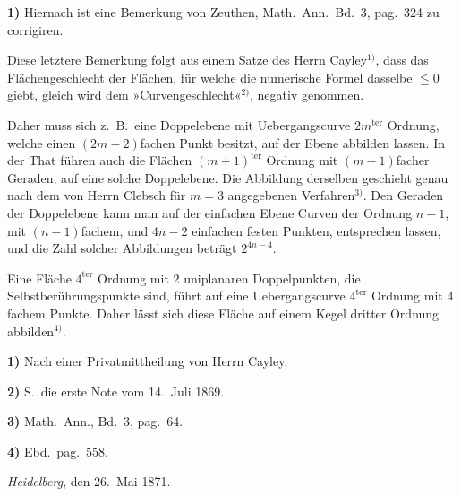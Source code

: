 \documentclass{article}
\begin{document}
\textbf{1)} Hiernach ist eine Bemerkung von Zeuthen, Math.\ Ann.\ Bd.\ 3, pag.\ 324 zu corrigiren.

Diese letztere Bemerkung folgt aus einem Satze des Herrn Cayley${}^{1)}$, dass das Flächengeschlecht der Flächen, für welche die numerische Formel dasselbe $\leqq 0$ giebt, gleich wird dem »Curvengeschlecht«${}^{2)}$, negativ genommen.

Daher muss sich z.\ B.\ eine Doppelebene mit Uebergangscurve $2m^{\text{ter}}$ Ordnung, welche einen $(2m-2)$fachen Punkt besitzt, auf der Ebene abbilden lassen. In der That führen auch die Flächen $(m+1)^{\text{ter}}$ Ordnung mit $(m-1)$facher Geraden, auf eine solche Doppelebene. Die Abbildung derselben geschieht genau nach dem von Herrn Clebsch für $m = 3$ angegebenen Verfahren${}^{3)}$. Den Geraden der Doppelebene kann man auf der einfachen Ebene Curven der Ordnung $n+1$, mit $(n-1)$fachem, und $4n-2$ einfachen festen Punkten, entsprechen lassen, und die Zahl solcher Abbildungen beträgt $2^{4n-4}$.

Eine Fläche $4^{\text{ter}}$ Ordnung mit 2 uniplanaren Doppelpunkten, die Selbstberührungspunkte sind, führt auf eine Uebergangscurve $4^{\text{ter}}$ Ordnung mit $4$fachem Punkte. Daher lässt sich diese Fläche auf einem Kegel dritter Ordnung abbilden${}^{4)}$.

\textbf{1)} Nach einer Privatmittheilung von Herrn Cayley.

\textbf{2)} S.\ die erste Note vom 14.\ Juli 1869.

\textbf{3)} Math.\ Ann., Bd.\ 3, pag.\ 64.

\textbf{4)} Ebd.\ pag.\ 558.

\emph{Heidelberg}, den 26.\ Mai 1871.
\end{document}
